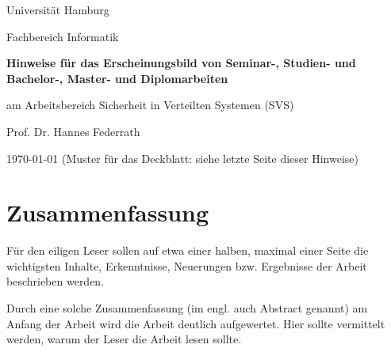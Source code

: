 \documentclass[12pt]{scrartcl}
\begin{document}
\newpage
\thispagestyle{empty}
\begin{center}\Large
Universität Hamburg \par
Fachbereich Informatik
\vfill
{\Large\textsf{\textbf{Hinweise für das Erscheinungsbild von Seminar-, Studien- und Bachelor-, Master- und Diplomarbeiten}}\par} 
\bigskip
am Arbeitsbereich Sicherheit in Verteilten Systemen (SVS) \par
\bigskip
Prof. Dr. Hannes Federrath \par
\bigskip
\today
\vfill
\vfill 
(Muster für das Deckblatt: siehe letzte Seite dieser Hinweise)
\end{center}

\newpage
\section*{Zusammenfassung}

Für den eiligen Leser sollen auf etwa einer halben, maximal einer Seite die wichtigsten Inhalte, Erkenntnisse, Neuerungen bzw. Ergebnisse der Arbeit beschrieben werden. 

Durch eine solche Zusammenfassung (im engl. auch Abstract genannt) am Anfang der Arbeit wird die Arbeit deutlich aufgewertet. Hier sollte vermittelt werden, warum der Leser die Arbeit lesen sollte.

\newpage

\tableofcontents
\newpage















\end{document}
